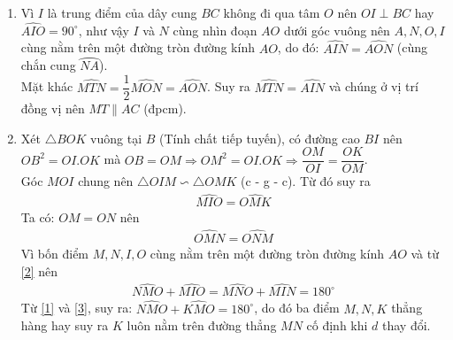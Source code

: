 \begin{ex}
{\begin{enumerate}
\begin{itemize}
			\item $\widehat{MAC}$ chung
			\item $\widehat{MCA} = \widehat{AMB}$ (cùng chắn cung $\wideparen{MB}$)
		\end{itemize}
	Suy ra $\triangle AMB \backsim \triangle ACM$.\\
	$\Rightarrow \dfrac{AM}{AB} = \dfrac{AC}{AM}$ (Tính chất tam giác đồng dạng)\\
	$\Rightarrow AM^2 = AB \cdot AC$.\\
	Mà $AM = AN$ (Tính chất hai tiếp tuyến cắt nhau).\\
	Vậy $AN^2 = AB \cdot AC$ (Đpcm).\\
	Ta có $AN^2 = AB \cdot AC \Rightarrow 36 = 4 \cdot AC \Rightarrow AC = 9$ (cm).\\
	Mà $AC = AB + BC \Rightarrow BC = AC - AB = 9 - 4 = 5$ (cm).
\item Vì $I$ là trung điểm của dây cung $BC$ không đi qua tâm $O$ nên $OI \perp BC$ hay $\widehat{AIO} = 90^\circ$, như vậy $I$ và $N$ cùng nhìn đoạn $AO$ dưới góc vuông nên $A, N, O, I$ cùng nằm trên một đường tròn đường kính $AO$, do đó: $\widehat{AIN} = \widehat{AON}$ (cùng chắn cung $\wideparen{NA}$).\\
Mặt khác $\widehat{MTN} = \dfrac{1}{2}\widehat{MON} = \widehat{AON}$. Suy ra $\widehat{MTN} = \widehat{AIN}$ và chúng ở vị trí đồng vị nên $MT \parallel AC$ (đpcm).
\item Xét $\triangle BOK$ vuông tại $B$ (Tính chất tiếp tuyến), có đường cao $BI$ nên $OB^2 = OI.OK$ mà $OB = OM \Rightarrow OM^2 = OI.OK \Rightarrow \dfrac{OM}{OI} = \dfrac{OK}{OM}$.\\ 
Góc $MOI$ chung nên $\triangle OIM \backsim \triangle OMK$ (c - g - c). Từ đó suy ra 
\begin{align}\label{1}
\widehat{MIO} = \widehat{OMK}
\end{align}
Ta có: $OM = ON$ nên
\begin{align}\label{2}
\widehat{OMN} = \widehat{ONM}
\end{align}
Vì bốn điểm $M, N, I, O$ cùng nằm trên một đường tròn đường kính $AO$ và từ \eqref{2} nên
\begin{align}\label{3}
\widehat{NMO} + \widehat{MIO} = \widehat{MNO} + \widehat{MIN} = 180^\circ
\end{align}
Từ \eqref{1} và \eqref{3}, suy ra: $\widehat{NMO} + \widehat{KMO} = 180^\circ$, do đó ba điểm $M, N, K$ thẳng hàng hay suy ra $K$ luôn nằm trên đường thẳng $MN$ cố định khi $d$ thay đổi.
\end{enumerate}
}
\end{ex}  

